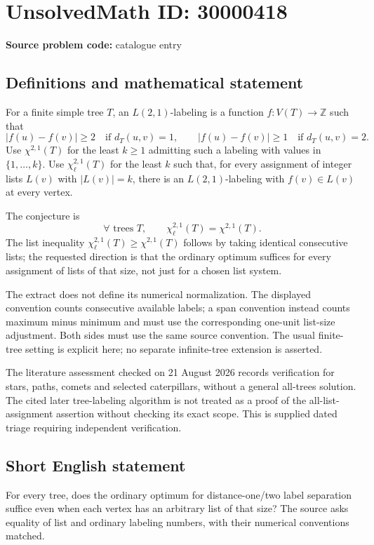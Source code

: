\documentclass[11pt]{article}
\newcommand{\Z}{\mathbb{Z}}
\begin{document}
\section*{UnsolvedMath ID: 30000418}
\textbf{Source problem code:} catalogue entry
\subsection{Definitions and mathematical statement}
For a finite simple tree $T$, an $L(2,1)$-labeling is a function $f:V(T)\to\Z$ such that
\[
 |f(u)-f(v)|\ge2\quad\text{if }d_T(u,v)=1,\qquad
 |f(u)-f(v)|\ge1\quad\text{if }d_T(u,v)=2.
\]
Use $\chi^{2,1}(T)$ for the least $k\ge1$ admitting such a labeling with values in $\{1,\ldots,k\}$. Use $\chi^{2,1}_\ell(T)$ for the least $k$ such that, for every assignment of integer lists $L(v)$ with $|L(v)|=k$, there is an $L(2,1)$-labeling with $f(v)\in L(v)$ at every vertex.

The conjecture is
\[
 \forall\text{ trees }T,\qquad
 \chi^{2,1}_\ell(T)=\chi^{2,1}(T).
\]
The list inequality $\chi^{2,1}_\ell(T)\ge\chi^{2,1}(T)$ follows by taking identical consecutive lists; the requested direction is that the ordinary optimum suffices for every assignment of lists of that size, not just for a chosen list system.

The extract does not define its numerical normalization. The displayed convention counts consecutive available labels; a span convention instead counts maximum minus minimum and must use the corresponding one-unit list-size adjustment. Both sides must use the same source convention. The usual finite-tree setting is explicit here; no separate infinite-tree extension is asserted.

The literature assessment checked on 21 August 2026 records verification for stars, paths, comets and selected caterpillars, without a general all-trees solution. The cited later tree-labeling algorithm is not treated as a proof of the all-list-assignment assertion without checking its exact scope. This is supplied dated triage requiring independent verification.
\subsection{Short English statement}
For every tree, does the ordinary optimum for distance-one/two label separation suffice even when each vertex has an arbitrary list of that size? The source asks equality of list and ordinary labeling numbers, with their numerical conventions matched.
\end{document}
